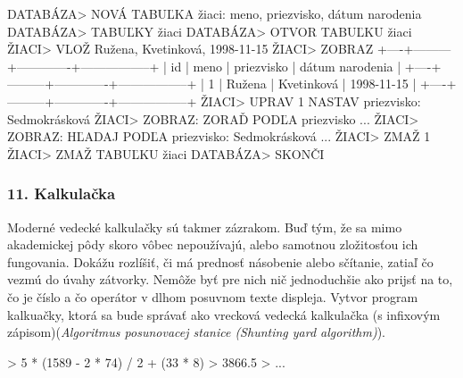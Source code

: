 \begin{code}
DATABÁZA> NOVÁ TABUĽKA žiaci: meno, priezvisko, dátum narodenia
DATABÁZA> TABUĽKY
žiaci
DATABÁZA> OTVOR TABUĽKU žiaci
ŽIACI> VLOŽ Ružena, Kvetinková, 1998-11-15
ŽIACI> ZOBRAZ
   +----+---------+-------------+-----------------+
   | id |  meno   |  priezvisko | dátum narodenia |
   +----+---------+-------------+-----------------+
   | 1  |  Ružena | Kvetinková  |  1998-11-15     |
   +----+---------+-------------+-----------------+
ŽIACI> UPRAV 1 NASTAV priezvisko: Sedmokrásková
ŽIACI> ZOBRAZ: ZORAĎ PODĽA priezvisko
...
ŽIACI> ZOBRAZ: HĽADAJ PODĽA priezvisko: Sedmokrásková
...
ŽIACI> ZMAŽ 1
ŽIACI> ZMAŽ TABUĽKU žiaci
DATABÁZA> SKONČI
\end{code}


\subsubsection*{11. Kalkulačka}
Moderné vedecké kalkulačky sú takmer zázrakom. Buď tým, že sa mimo akademickej pôdy skoro vôbec nepoužívajú, alebo samotnou zložitosťou ich fungovania. Dokážu rozlíšiť, či má prednosť násobenie alebo sčítanie, zatiaľ čo vezmú do úvahy zátvorky. Nemôže byť pre nich nič jednoduchšie ako prijsť na to, čo je číslo a čo operátor v dlhom posuvnom texte displeja. Vytvor program kalkuačky, ktorá sa bude správať ako vrecková vedecká kalkulačka (s infixovým zápisom)(\textit{Algoritmus posunovacej stanice (Shunting yard algorithm)}).

\begin{code}
> 5 * (1589 - 2 * 74) / 2 + (33 * 8)
> 3866.5
> ...
\end{code} 
